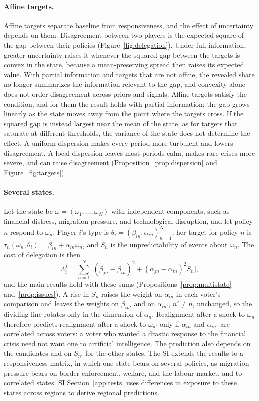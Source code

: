 \documentclass[12pt,letterpaper]{article}
\begin{document}
\paragraph{Affine targets.} Affine targets separate baseline from responsiveness, and the effect of uncertainty depends on them. Disagreement between two players is the expected square of the gap between their policies (Figure~\ref{fig:delegation}). Under full information, greater uncertainty raises it whenever the squared gap between the targets is convex in the state, because a mean-preserving spread then raises its expected value. With partial information and targets that are not affine, the revealed share no longer summarizes the information relevant to the gap, and convexity alone does not order disagreement across priors and signals. Affine targets satisfy the condition, and for them the result holds with partial information: the gap grows linearly as the state moves away from the point where the targets cross. If the squared gap is instead largest near the mean of the state, as for targets that saturate at different thresholds, the variance of the state does not determine the effect. A uniform dispersion makes every period more turbulent and lowers disagreement. A local dispersion leaves most periods calm, makes rare crises more severe, and can raise disagreement (Proposition~\ref{prop:dispersion} and Figure~\ref{fig:targets}).

\paragraph{Several states.} Let the state be $\omega=(\omega_1,\dots,\omega_N)$ with independent components, such as financial distress, migration pressure, and technological disruption, and let policy $n$ respond to $\omega_n$. Player $i$'s type is $\theta_i=(\beta_{in},\alpha_{in})_{n=1}^N$, her target for policy $n$ is $\tau_n(\omega_n,\theta_i)=\beta_{in}+\alpha_{in}\omega_n$, and $S_n$ is the unpredictability of events about $\omega_n$. The cost of delegation is then
\[
\Lambda_i^j=\sum_{n=1}^N\Big[(\beta_{jn}-\beta_{in})^2+(\alpha_{jn}-\alpha_{in})^2S_n\Big],
\]
and the main results hold with these sums (Propositions~\ref{prop:multistate} and~\ref{prop:issues}). A rise in $S_n$ raises the weight on $\alpha_{in}$ in each voter's comparison and leaves the weights on $\beta_{in'}$ and on $\alpha_{in'}$, $n'\ne n$, unchanged, so the dividing line rotates only in the dimension of $\alpha_n$. Realignment after a shock to $\omega_n$ therefore predicts realignment after a shock to $\omega_{n'}$ only if $\alpha_{in}$ and $\alpha_{in'}$ are correlated across voters: a voter who wanted a drastic response to the financial crisis need not want one to artificial intelligence. The prediction also depends on the candidates and on $S_{n'}$ for the other states. The SI extends the results to a responsiveness matrix, in which one state bears on several policies, as migration pressure bears on border enforcement, welfare, and the labour market, and to correlated states. SI Section~\ref{app:tests} uses differences in exposure to these states across regions to derive regional predictions.
\end{document}
